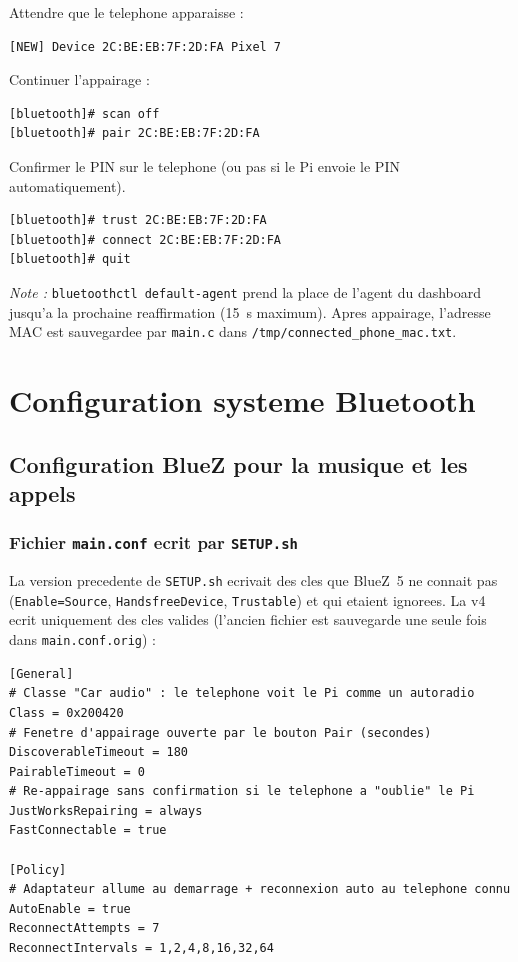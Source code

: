 \documentclass[a4paper,11pt]{article}
\begin{document}
Attendre que le telephone apparaisse :

\begin{verbatim}
[NEW] Device 2C:BE:EB:7F:2D:FA Pixel 7
\end{verbatim}

Continuer l'appairage :

\begin{lstlisting}[style=bashcode]
[bluetooth]# scan off
[bluetooth]# pair 2C:BE:EB:7F:2D:FA
\end{lstlisting}

Confirmer le PIN sur le telephone (ou pas si le Pi envoie le PIN automatiquement).

\begin{lstlisting}[style=bashcode]
[bluetooth]# trust 2C:BE:EB:7F:2D:FA
[bluetooth]# connect 2C:BE:EB:7F:2D:FA
[bluetooth]# quit
\end{lstlisting}

\emph{Note :} \texttt{bluetoothctl default-agent} prend la place de l'agent du dashboard
jusqu'a la prochaine reaffirmation (15~s maximum). Apres appairage, l'adresse MAC est
sauvegardee par \texttt{main.c} dans \texttt{/tmp/connected\_phone\_mac.txt}.

\section{Configuration systeme Bluetooth}

\subsection{Configuration BlueZ pour la musique et les appels}

\subsubsection{Fichier \texttt{main.conf} ecrit par \texttt{SETUP.sh}}

La version precedente de \texttt{SETUP.sh} ecrivait des cles que BlueZ~5 ne connait pas
(\texttt{Enable=Source}, \texttt{HandsfreeDevice}, \texttt{Trustable}) et qui etaient
ignorees. La v4 ecrit uniquement des cles valides (l'ancien fichier est sauvegarde une
seule fois dans \texttt{main.conf.orig}) :

\begin{lstlisting}[style=confcode,caption={/etc/bluetooth/main.conf (v4)}]
[General]
# Classe "Car audio" : le telephone voit le Pi comme un autoradio
Class = 0x200420
# Fenetre d'appairage ouverte par le bouton Pair (secondes)
DiscoverableTimeout = 180
PairableTimeout = 0
# Re-appairage sans confirmation si le telephone a "oublie" le Pi
JustWorksRepairing = always
FastConnectable = true

[Policy]
# Adaptateur allume au demarrage + reconnexion auto au telephone connu
AutoEnable = true
ReconnectAttempts = 7
ReconnectIntervals = 1,2,4,8,16,32,64
\end{lstlisting}
\end{document}
